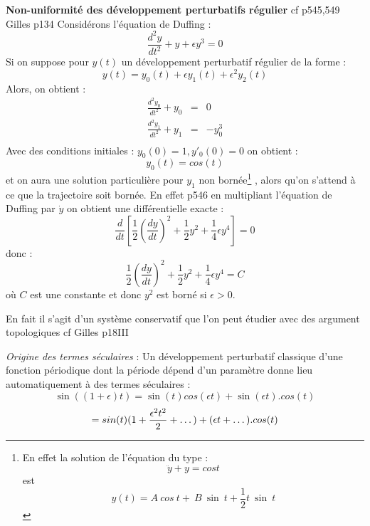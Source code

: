 \documentclass[12pt]{book}
\begin{document}
\begin{exmp}
{\bf Non-uniformit\'e des d\'eveloppement perturbatifs r\'egulier} cf
\cite{ma:equad:Bender87}p545,549 Gilles p134 
Consid\'erons l'\'equation de Duffing :
\begin{equation}
\frac{d^2y}{dt^2}+y+\epsilon y^3=0
\end{equation}
Si on suppose pour $y(t)$ un d\'eveloppement perturbatif r\'egulier de la
forme :
\begin{equation}
y(t)=y_0(t)+\epsilon y_1(t)+\epsilon^2 y_2(t)
\end{equation}
Alors, on obtient :
\begin{eqnarray}
\frac{d^2y_0}{dt^2}+y_0&=&0\\
\frac{d^2y_1}{dt^2}+y_1&=&-y_0^3
\\ \end{eqnarray}
Avec des conditions initiales : $y_0(0)=1,y'_0(0)=0$ on obtient :
\begin{equation}
y_0(t)=cos(t)
\end{equation}
et on aura une solution particuli\`ere pour $y_1$ non
born\'ee\footnote%
{En effet la solution de l'\'equation du type :
\begin{equation}
\ddot y+y=cos t
\end{equation}
est 
\begin{equation}
y(t)=A\ cos\ t+\ B\ \sin\ t+\frac{1}{2}t\ \sin\ t
\end{equation}
}%
, alors qu'on s'attend \`a ce que la trajectoire soit born\'ee.
En effet \cite{ma:equad:Bender87} p546 en multipliant l'\'equation de Duffing
par $\dot y$ on obtient une diff\'erentielle exacte :
\begin{equation}
\frac{d}{dt}[\frac{1}{2}(\frac{dy}{dt})^2+
\frac{1}{2}y^2+\frac{1}{4}\epsilon y^4]=0
\end{equation}
donc :
\begin{equation}
\frac{1}{2}(\frac{dy}{dt})^2+\frac{1}{2}y^2+\frac{1}{4}\epsilon
y^4=C
\end{equation}
o\`u $C$ est une constante et donc $y^2$ est born\'e si $\epsilon > 0$. 
\begin{rem}
En fait il s'agit d'un syst\`eme conservatif que l'on peut \'etudier avec
des argument topologiques cf Gilles p18III
\end{rem}
\end{exmp}
\begin{rem}
{\it Origine des termes s\'eculaires }: Un d\'eveloppement perturbatif
classique d'une fonction p\'eriodique dont la p\'eriode d\'epend d'un
param\`etre donne lieu automatiquement \`a des termes
s\'eculaires\cite{ma:equad:Gille88,ma:equad:Bender87} :
\begin{equation}
\sin((1+\epsilon) t)=\sin(t)cos(\epsilon t)+\sin(\epsilon t).cos(t)
\end{equation}
\begin{equation}
=\\sin(t)(1+\frac{\epsilon^2t^2}{2}+\dots)+(\epsilon t+\dots).cos(t)
\end{equation}
\end{rem}
\end{document}

